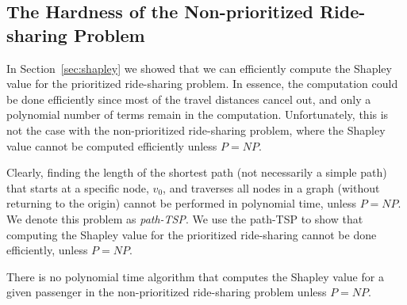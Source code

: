 \documentclass[sigconf]{aamas}
\begin{document}
\subsection{The Hardness of the Non-prioritized Ride-sharing Problem}
In Section~\ref{sec:shapley} we showed that we can efficiently compute the Shapley value for the prioritized ride-sharing problem. In essence, the computation could be done efficiently since most of the travel distances cancel out, and only a polynomial number of terms remain in the computation. Unfortunately, this is not the case with the non-prioritized ride-sharing problem, where the Shapley value cannot be computed efficiently unless $P=NP$. 

Clearly, finding the length of the shortest path (not necessarily a simple path) that starts at a specific node, $v_0$, and traverses all nodes in a graph (without returning to the origin) cannot be performed in polynomial time, unless $P=NP$. We denote this problem as \emph{path-TSP}.
%
We use the path-TSP to show that computing the Shapley value for the prioritized ride-sharing cannot be done efficiently, unless $P=NP$.
\begin{theorem}
There is no polynomial time algorithm that computes the Shapley value for a given passenger in the non-prioritized ride-sharing problem unless $P=NP$.
\end{theorem}
\end{document}

